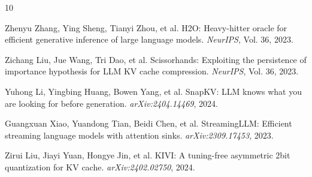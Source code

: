 \documentclass[11pt]{article}
\begin{document}
\begin{thebibliography}{10}

Zhenyu Zhang, Ying Sheng, Tianyi Zhou, et al.
\newblock H2O: Heavy-hitter oracle for efficient generative inference of large language models.
\newblock \textit{NeurIPS}, Vol. 36, 2023.

Zichang Liu, Jue Wang, Tri Dao, et al.
\newblock Scissorhands: Exploiting the persistence of importance hypothesis for LLM KV cache compression.
\newblock \textit{NeurIPS}, Vol. 36, 2023.

Yuhong Li, Yingbing Huang, Bowen Yang, et al.
\newblock SnapKV: LLM knows what you are looking for before generation.
\newblock \textit{arXiv:2404.14469}, 2024.

Guangxuan Xiao, Yuandong Tian, Beidi Chen, et al.
\newblock StreamingLLM: Efficient streaming language models with attention sinks.
\newblock \textit{arXiv:2309.17453}, 2023.

Zirui Liu, Jiayi Yuan, Hongye Jin, et al.
\newblock KIVI: A tuning-free asymmetric 2bit quantization for KV cache.
\newblock \textit{arXiv:2402.02750}, 2024.

\end{thebibliography}
\end{document}

